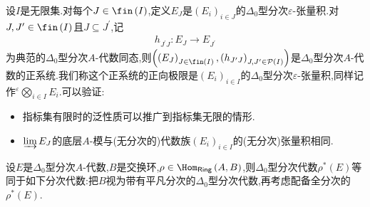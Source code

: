 \begin{remark}{}{}
	设$I$是无限集.对每个$J\in\fin\left(I\right)$,定义$E_{J}$是$\left(E_{i}\right)_{i\in J}$的$\Delta_{0}$型分次$\varepsilon$-张量积.对$J,J^{\prime}\in\fin\left(I\right)$且$J\subseteq J^{\prime}$,记
	\begin{align*}
		h_{J^{\prime}J}:E_{J}\to E_{J^{\prime}}
	\end{align*}
	为典范的$\Delta_{0}$型分次$A$-代数同态,则$\left(\left(E_{J}\right)_{J\in\fin\left(I\right)},\left(h_{J^{\prime}J}\right)_{J,J^{\prime}\in\mathcal{P}\left(I\right)}\right)$是$\Delta_{0}$型分次$A$-代数的正系统.我们称这个正系统的正向极限是$\left(E_{i}\right)_{i\in I}$的$\Delta_{0}$型分次$\varepsilon$-张量积,同样记作${}^{\varepsilon}\bigotimes\limits_{i\in I}E_{i}$.可以验证:
	\begin{itemize}
		\item 指标集有限时的泛性质可以推广到指标集无限的情形.
		\item $\varinjlim E_{J}$的底层$A$-模与(无分次的)代数族$\left(E_{i}\right)_{i\in I}$的(无分次)张量积相同.
	\end{itemize}
\end{remark}

\begin{remark}{}{}
	设$E$是$\Delta_{0}$型分次$A$-代数,$B$是交换环,$\rho\in\Hom_{\mathsf{Ring}}\left(A,B\right)$,则$\Delta_{0}$型分次代数$\rho^{\ast}\left(E\right)$等同于如下分次代数:把$B$视为带有平凡分次的$\Delta_{0}$型分次代数,再考虑配备全分次的$\rho^{\ast}\left(E\right)$.
\end{remark}





